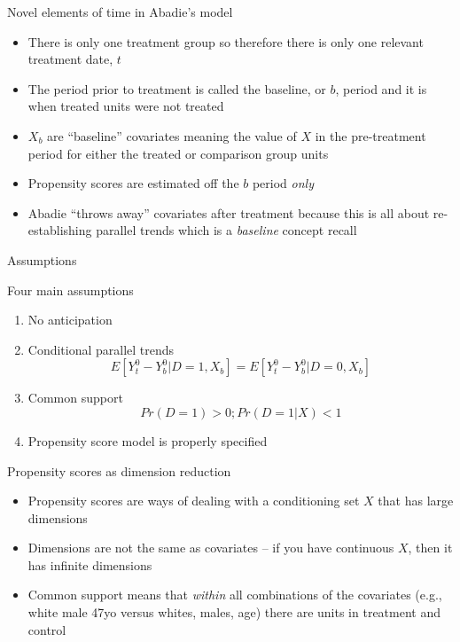 \documentclass{beamer}
\begin{document}
\begin{frame}{Novel elements of time in Abadie's model}

\begin{itemize}
\item There is only one treatment group so therefore there is only one relevant treatment date, $t$
\item The period prior to treatment is called the baseline, or $b$, period and it is when treated units were not treated
\item $X_b$ are ``baseline'' covariates meaning the value of $X$ in the pre-treatment period for either the treated or comparison group units
\item Propensity scores are estimated off the $b$ period \emph{only}
\item Abadie ``throws away'' covariates after treatment because this is all about re-establishing parallel trends which is a \emph{baseline} concept recall
\end{itemize}

\end{frame}

\begin{frame}{Assumptions}

Four main assumptions

\begin{enumerate}
\item No anticipation
\item Conditional parallel trends $$E[Y^0_t - Y^0_b|D=1,X_b] = E[Y^0_t - Y^0_b | D=0, X_b]$$
\item Common support $$Pr(D=1)>0; Pr(D=1|X)<1$$
\item Propensity score model is properly specified
\end{enumerate}

\end{frame}

\begin{frame}{Propensity scores as dimension reduction}

\begin{itemize}

\item Propensity scores are ways of dealing with a conditioning set $X$ that has large dimensions
\item Dimensions are not the same as covariates -- if you have continuous $X$, then it has infinite dimensions
\item Common support means that \emph{within} all combinations of the covariates (e.g., white male 47yo versus whites, males, age) there are units in treatment and control

\end{itemize}

\end{frame}
\end{document}
